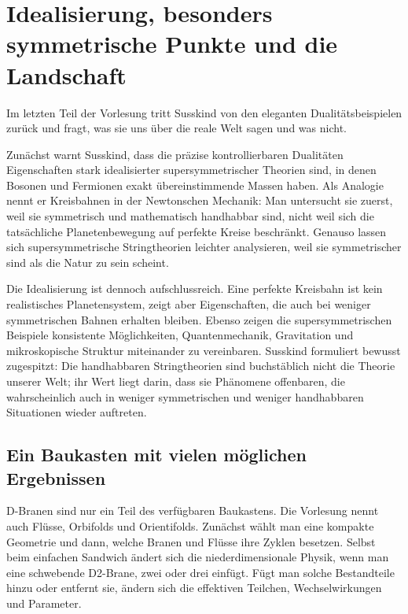 \section{Idealisierung, besonders symmetrische Punkte und die Landschaft}

Im letzten Teil der Vorlesung tritt Susskind von den eleganten Dualitätsbeispielen zurück und fragt, was sie uns über die reale Welt sagen und was nicht.

Zunächst warnt Susskind, dass die präzise kontrollierbaren Dualitäten Eigenschaften stark idealisierter supersymmetrischer Theorien sind, in denen Bosonen und Fermionen exakt übereinstimmende Massen haben. Als Analogie nennt er Kreisbahnen in der Newtonschen Mechanik: Man untersucht sie zuerst, weil sie symmetrisch und mathematisch handhabbar sind, nicht weil sich die tatsächliche Planetenbewegung auf perfekte Kreise beschränkt. Genauso lassen sich supersymmetrische Stringtheorien leichter analysieren, weil sie symmetrischer sind als die Natur zu sein scheint.

Die Idealisierung ist dennoch aufschlussreich. Eine perfekte Kreisbahn ist kein realistisches Planetensystem, zeigt aber Eigenschaften, die auch bei weniger symmetrischen Bahnen erhalten bleiben. Ebenso zeigen die supersymmetrischen Beispiele konsistente Möglichkeiten, Quantenmechanik, Gravitation und mikroskopische Struktur miteinander zu vereinbaren. Susskind formuliert bewusst zugespitzt: Die handhabbaren Stringtheorien sind buchstäblich nicht die Theorie unserer Welt; ihr Wert liegt darin, dass sie Phänomene offenbaren, die wahrscheinlich auch in weniger symmetrischen und weniger handhabbaren Situationen wieder auftreten.

\subsection{Ein Baukasten mit vielen möglichen Ergebnissen}

D-Branen sind nur ein Teil des verfügbaren Baukastens. Die Vorlesung nennt auch Flüsse, Orbifolds und Orientifolds. Zunächst wählt man eine kompakte Geometrie und dann, welche Branen und Flüsse ihre Zyklen besetzen. Selbst beim einfachen Sandwich ändert sich die niederdimensionale Physik, wenn man eine schwebende D2-Brane, zwei oder drei einfügt. Fügt man solche Bestandteile hinzu oder entfernt sie, ändern sich die effektiven Teilchen, Wechselwirkungen und Parameter.

